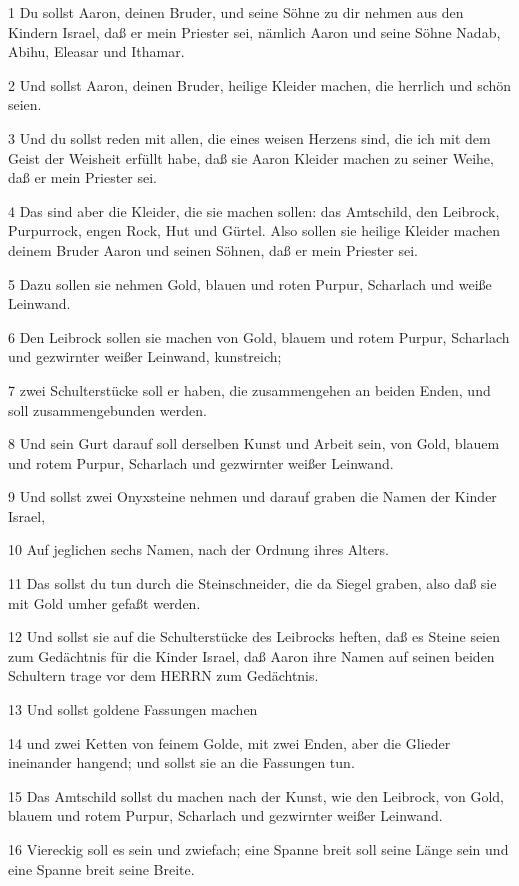 \par 1 Du sollst Aaron, deinen Bruder, und seine Söhne zu dir nehmen aus den Kindern Israel, daß er mein Priester sei, nämlich Aaron und seine Söhne Nadab, Abihu, Eleasar und Ithamar.
\par 2 Und sollst Aaron, deinen Bruder, heilige Kleider machen, die herrlich und schön seien.
\par 3 Und du sollst reden mit allen, die eines weisen Herzens sind, die ich mit dem Geist der Weisheit erfüllt habe, daß sie Aaron Kleider machen zu seiner Weihe, daß er mein Priester sei.
\par 4 Das sind aber die Kleider, die sie machen sollen: das Amtschild, den Leibrock, Purpurrock, engen Rock, Hut und Gürtel. Also sollen sie heilige Kleider machen deinem Bruder Aaron und seinen Söhnen, daß er mein Priester sei.
\par 5 Dazu sollen sie nehmen Gold, blauen und roten Purpur, Scharlach und weiße Leinwand.
\par 6 Den Leibrock sollen sie machen von Gold, blauem und rotem Purpur, Scharlach und gezwirnter weißer Leinwand, kunstreich;
\par 7 zwei Schulterstücke soll er haben, die zusammengehen an beiden Enden, und soll zusammengebunden werden.
\par 8 Und sein Gurt darauf soll derselben Kunst und Arbeit sein, von Gold, blauem und rotem Purpur, Scharlach und gezwirnter weißer Leinwand.
\par 9 Und sollst zwei Onyxsteine nehmen und darauf graben die Namen der Kinder Israel,
\par 10 Auf jeglichen sechs Namen, nach der Ordnung ihres Alters.
\par 11 Das sollst du tun durch die Steinschneider, die da Siegel graben, also daß sie mit Gold umher gefaßt werden.
\par 12 Und sollst sie auf die Schulterstücke des Leibrocks heften, daß es Steine seien zum Gedächtnis für die Kinder Israel, daß Aaron ihre Namen auf seinen beiden Schultern trage vor dem HERRN zum Gedächtnis.
\par 13 Und sollst goldene Fassungen machen
\par 14 und zwei Ketten von feinem Golde, mit zwei Enden, aber die Glieder ineinander hangend; und sollst sie an die Fassungen tun.
\par 15 Das Amtschild sollst du machen nach der Kunst, wie den Leibrock, von Gold, blauem und rotem Purpur, Scharlach und gezwirnter weißer Leinwand.
\par 16 Viereckig soll es sein und zwiefach; eine Spanne breit soll seine Länge sein und eine Spanne breit seine Breite.
